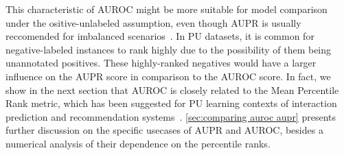 
%
%
%
%


This characteristic of AUROC might be more suitable for model comparison under the ositive-unlabeled assumption, even though AUPR is usually reccomended for imbalanced scenarios~\cite{he2009learning,saito2015precisionrecall,fernandez2018learning}.
In PU datasets, it is common for negative-labeled instances to rank highly due to the possibility of them being unannotated positives. These highly-ranked negatives would have a larger influence on the AUPR score in comparison to the AUROC score.
In fact, we show in the next section that AUROC is closely related to the Mean Percentile Rank metric, which has been suggested for PU learning contexts of interaction prediction and recommendation systems~\cite{pahikkala2015more,johnson2014logistic,hao2019opensource,yu2020fpscdtia}. \autoref{sec:comparing auroc aupr} presents further discussion on the specific usecases of AUPR and AUROC, besides a numerical analysis of their dependence on the percentile ranks.


